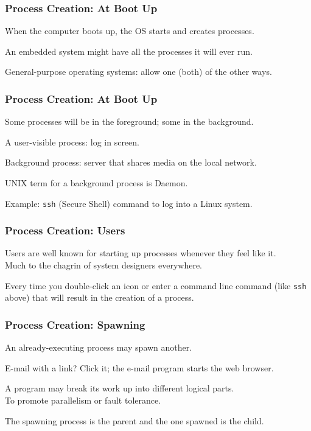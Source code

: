 \begin{frame}
\frametitle{Process Creation: At Boot Up}

When the computer boots up, the OS starts and creates processes.

An embedded system might have all the processes it will ever run.

General-purpose operating systems: allow one (both) of the other ways.


\end{frame}

\begin{frame}
\frametitle{Process Creation: At Boot Up}

Some processes will be in the foreground; some in the background. 

A user-visible process: log in screen.

Background process: server that shares media on the local network. 

UNIX term for a background process is \alert{Daemon}.

Example: \texttt{ssh} (Secure Shell) command to log into a Linux system.


\end{frame}

\begin{frame}
\frametitle{Process Creation: Users}

Users are well known for starting up processes whenever they feel like it.\\
\quad Much to the chagrin of system designers everywhere. 

Every time you double-click an icon or enter a command line command (like \texttt{ssh} above) that will result in the creation of a process. 


\end{frame}

\begin{frame}
\frametitle{Process Creation: Spawning}

An already-executing process may spawn another. 

E-mail with a link? Click it; the e-mail program starts the web browser.

A program may break its work up into different logical parts.\\
\quad To promote parallelism or fault tolerance. 

The spawning process is the \alert{parent} and the one spawned is the \alert{child}. 


\end{frame}

